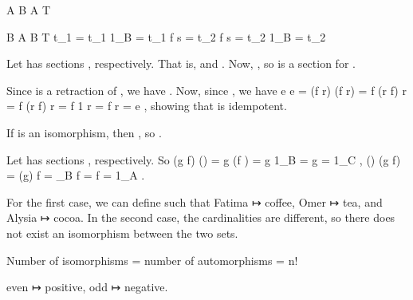 	\startsection [title={Article II, Exercise 6}]
		\starttikzcd
			A
				\arrow[r, "f"]
			\NC  B
				\arrow[r, "r"]
			\NC  A
				\arrow[r, "g"]
			\NC  T
			\NR
		\stoptikzcd
	\stopsection

	\startsection [title={Article II, Exercise 7}]
		\starttikzcd
			B \arrow[r, "s"] 
			\NC  A \arrow[r, "f"]
			\NC  B  
			\NC  T
			\NR
		\stoptikzcd
		\startformula
			t_1 = t_1 1_B = t_1 f s = t_2 f s = t_2 1_B = t_2
		\stopformula
	\stopsection

	\startsection [title={Article II, Exercise 8}]
		Let  has sections , respectively. That is,  and . Now, , so  is a section for .
	\stopsection

	\startsection [title={Article II, Exercise 9}]
		Since  is a retraction of , we have . Now, since , we have
		\startformula
			e e  =  (f r) (f r)  =  f (r f) r  =  f (r f) r  =  f 1 r  =  f r  =  e ,
		\stopformula
		showing that  is idempotent.

		If  is an isomorphism, then , so .
	\stopsection

	\startsection [title={Article II, Exercise 10}]
		Let  has sections , respectively. So
		\startformula \startalign[align={left}]
			\NC  (g f) (\inv[f]	 \inv[g])  =  g (f \inv[f])	 \inv[g]  =  g 1_B	 \inv[g]  =  g \inv[g]  =  1_C ,    \NR
			\NC  (\inv[f]	 \inv[g]) (g f)  =  \inv[f]	 (\inv[g] g) f  =  _B	 f  =  \inv[f] f  =  1_A .  \NR
		\stopalign \stopformula
	\stopsection

	\startsection [title={Article II, Exercise 11}]
		For the first case, we can define  such that Fatima ↦ coffee, Omer ↦ tea, and Alysia ↦ cocoa. In the second case, the cardinalities are different, so there does not exist an isomorphism between the two sets.
	\stopsection

	\startsection [title={Article II, Exercise 12}]
		Number of isomorphisms = number of automorphisms = n!
	\stopsection

	\startsection [title={Session 4, Exercise 2}]
		even ↦ positive, odd ↦	negative.
	\stopsection

